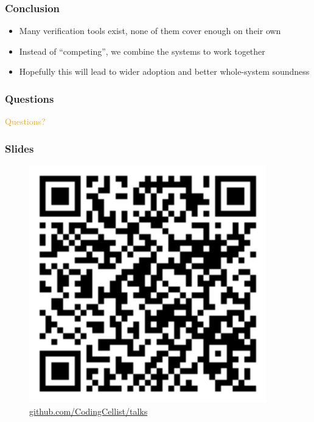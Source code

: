 \documentclass[compress,handout]{beamer}
\begin{document}
\begin{frame}
  \frametitle{Conclusion}

  \begin{itemize}
    \item<1-> Many verification tools exist, none of them cover enough on their
              own
    \item<2-> Instead of ``competing'', we combine the systems to work together
    \item<3-> Hopefully this will lead to wider adoption and better whole-system
              soundness
  \end{itemize}

\end{frame}


\begin{frame}
  \frametitle{Questions}

  \begin{center}
    \textcolor<1>{orange}{\Large Questions?}
  \end{center}

\end{frame}

\begin{frame}
  \frametitle{Slides}

  \begin{center}
    \begin{figure}
      \includegraphics[width=0.35\framewidth]{qr-code.png}
      \caption{\href{https://github.com/CodingCellist/talks/blob/main/2023-11-10-phd-seminar}{github.com/CodingCellist/talks}}
    \end{figure}
  \end{center}

\end{frame}
\end{document}
